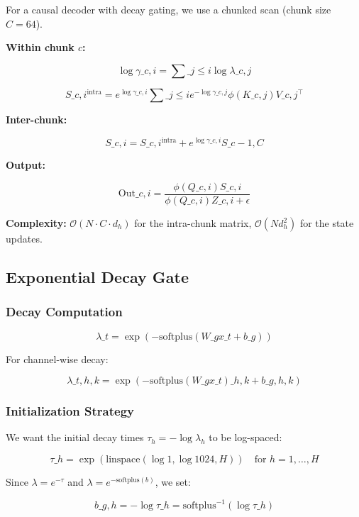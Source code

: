 For a causal decoder with decay gating, we use a chunked scan (chunk size $C = 64$).

\textbf{Within chunk $c$:}

\[
\log \gamma\_{c, i} = \sum\_{j \leq i} \log \lambda\_{c, j}
\tag{4.6}
\]

\[
S\_{c, i}^{\text{intra}} = e^{\log \gamma\_{c, i}} \sum\_{j \leq i} e^{-\log \gamma\_{c, j}} \phi(K\_{c, j}) V\_{c, j}^\top
\tag{4.7}
\]

\textbf{Inter-chunk:}

\[
S\_{c, i} = S\_{c, i}^{\text{intra}} + e^{\log \gamma\_{c, i}} S\_{c-1, C}
\tag{4.8}
\]

\textbf{Output:}

\[
\text{Out}\_{c, i} = \frac{\phi(Q\_{c, i}) S\_{c, i}}{\phi(Q\_{c, i}) Z\_{c, i} + \epsilon}
\tag{4.9}
\]

\textbf{Complexity:} $\mathcal{O}(N \cdot C \cdot d_h)$ for the intra-chunk matrix, 
$\mathcal{O}(N d_h^2)$ for the state updates.

\subsection{Exponential Decay Gate}

\subsubsection{Decay Computation}

\[
\lambda\_t = \exp(-\text{softplus}(W\_g x\_t + b\_g))
\tag{4.10}
\]

For channel-wise decay:

\[
\lambda\_{t, h, k} = \exp(-\text{softplus}(W\_g x\_t)\_{h, k} + b\_{g, h, k})
\tag{4.11}
\]

\subsubsection{Initialization Strategy}

We want the initial decay times $\tau_{h} = -\log \lambda_h$ to be log-spaced:

\[
\tau\_h = \exp\!\left(\text{linspace}(\log 1, \log 1024, H)\right) \quad \text{for } h = 1, \dots, H
\tag{4.12}
\]

Since $\lambda = e^{-\tau}$ and $\lambda = e^{-\text{softplus}(b)}$, we set:

\[
b\_{g, h} = -\log \tau\_h = \text{softplus}^{-1}(\log \tau\_h)
\tag{4.13}
\]

